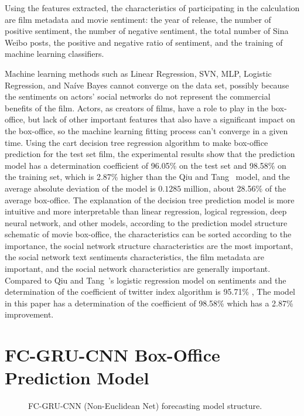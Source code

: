 \documentclass[review]{cvpr}
\begin{document}
Using the features extracted, the characteristics of participating in the calculation are film metadata and movie sentiment:
the year of release, the number of positive sentiment, the number of negative sentiment, the total number of Sina Weibo posts,
the positive and negative ratio of sentiment, and the training of machine learning classifiers.

Machine learning methods such as Linear Regression, SVN, MLP, Logistic Regression, and Na{\'i}ve Bayes cannot converge on the data set,
possibly because the sentiments on actors' social networks do not represent the commercial benefits of the film.
Actors, as creators of films, have a role to play in the box-office, but lack of other important features that also have a significant impact on the box-office,
so the machine learning fitting process can't converge in a given time.
Using the cart decision tree regression algorithm to make box-office prediction for the test set film,
the experimental results show that the prediction model has a determination coefficient of 96.05\% on the test set and 98.58\% on the training set, which is 2.87\% higher than the Qiu and Tang~\cite{qiu2018microblog} model,
and the average absolute deviation of the model is $0.1285$ million, about 28.56\% of the average box-office.
The explanation of the decision tree prediction model is more intuitive and more interpretable than linear regression, logical regression, deep neural network, and other models,
according to the prediction model structure schematic of movie box-office,
the characteristics can be sorted according to the importance, the social network structure characteristics are the most important,
the social network text sentiments characteristics, the film metadata are important, and the social network characteristics are generally important.
Compared to Qiu and Tang~\cite{qiu2018microblog}'s logistic regression model on sentiments and the determination of the coefficient of twitter index algorithm is 95.71\% ,
The model in this paper has a determination of the coefficient of 98.58\% which has a 2.87\% improvement.

\section{FC-GRU-CNN Box-Office Prediction Model}


\begin{figure*}
\begin{center}
\end{center}
   \caption{FC-GRU-CNN (Non-Euclidean Net) forecasting model structure.}
\label{fig:short}
\end{figure*}
\end{document}
